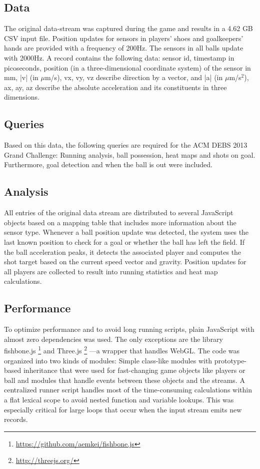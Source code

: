 \documentclass{sig-alternate}
\newcommand{\inlinelistingsize}{\fontsize{8pt}{11pt}}
\let\oldurl\url
\renewcommand{\url}[1]{\inlinelistingsize\oldurl{#1}}
\begin{document}
\subsection{Data}

The original data-stream was captured during the game
and results in a 4.62 GB CSV input file.
Position updates for sensors in players’ shoes
and goalkeepers’ hands are provided with a frequency of 200Hz.
The sensors in all balls update with 2000Hz.
A record contains the following data:
sensor id, timestamp in picoseconds, position
(in a three-dimensional coordinate system) of the sensor
in mm, |v| (in $\mu$m/s), vx, vy, vz
describe direction by a vector,
and |a| (in $\mu$m/s$^{2}$), ax, ay, az describe the absolute acceleration
and its constituents in three dimensions.

\subsection{Queries}

Based on this data, the following queries are required
for the ACM DEBS 2013 Grand Challenge:
Running analysis, ball possession, heat maps and shots on goal.
Furthermore, goal detection and when the ball is out were included.

\subsection{Analysis}

All entries of the original data stream are distributed
to several JavaScript objects based on a mapping table
that includes more information about the sensor type.
Whenever a ball position update was detected,
the system uses the last known position to check
for a goal or whether the ball has left the field.
If the ball acceleration peaks, it detects the associated player
and computes the shot target
based on the current speed vector and gravity.
Position updates for all players are collected
to result into running statistics and heat map calculations.

\subsection{Performance}

To optimize performance
and to avoid long running scripts,
plain JavaScript with almost zero dependencies was used.
The only exceptions are the library fishbone.js%
\footnote{\url{https://github.com/aemkei/fishbone.js}}
and Three.js%
\footnote{\url{http://threejs.org/}}
---a wrapper that handles WebGL.
The code was organized into two kinds of modules:
Simple class-like modules with prototype-based inheritance
that were used for fast-changing game objects
like players or ball
and modules that handle events between these objects
and the streams.
A centralized runner script handles
most of the time-consuming calculations within a flat lexical scope
to avoid nested function and variable lookups.
This was especially critical for large loops
that occur when the input stream emits new records.
\end{document}
